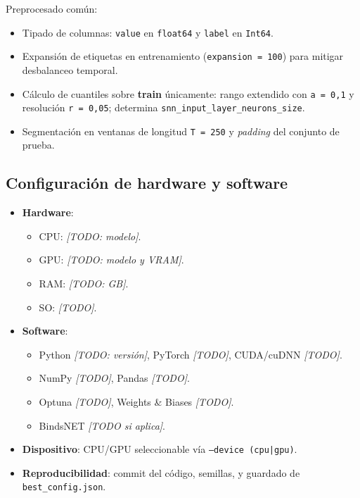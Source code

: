 Preprocesado común:
\begin{itemize}
    \item Tipado de columnas: \texttt{value} en \texttt{float64} y \texttt{label} en \texttt{Int64}.
    \item Expansión de etiquetas en entrenamiento (\texttt{expansion = 100}) para mitigar desbalanceo temporal.
    \item Cálculo de cuantiles sobre \textbf{train} únicamente: rango extendido con \texttt{a = 0{,}1} y resolución \texttt{r = 0{,}05}; determina \texttt{snn\_input\_layer\_neurons\_size}.
    \item Segmentación en ventanas de longitud \texttt{T = 250} y \textit{padding} del conjunto de prueba.
\end{itemize}

\subsection{Configuración de hardware y software}
\begin{itemize}
    \item \textbf{Hardware}:
    \begin{itemize}
        \item CPU: \textit{[TODO: modelo]}.
        \item GPU: \textit{[TODO: modelo y VRAM]}.
        \item RAM: \textit{[TODO: GB]}.
        \item SO: \textit{[TODO]}.
    \end{itemize}
    \item \textbf{Software}:
    \begin{itemize}
        \item Python \textit{[TODO: versión]}, PyTorch \textit{[TODO]}, CUDA/cuDNN \textit{[TODO]}.
        \item NumPy \textit{[TODO]}, Pandas \textit{[TODO]}.
        \item Optuna \textit{[TODO]}, Weights \& Biases \textit{[TODO]}.
        \item BindsNET \textit{[TODO si aplica]}.
    \end{itemize}
    \item \textbf{Dispositivo}: CPU/GPU seleccionable vía \texttt{--device (cpu|gpu)}.
    \item \textbf{Reproducibilidad}: commit del código, semillas, y guardado de \texttt{best\_config.json}.
\end{itemize}

